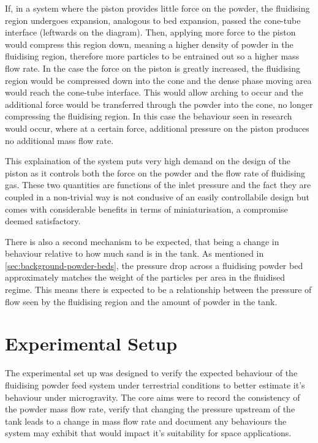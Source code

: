 If, in a system where the piston provides little force on the powder, the fluidising region undergoes expansion, analogous to bed expansion, passed the cone-tube interface (leftwards on the diagram). Then, applying more force to the piston would compress this region down, meaning a higher density of powder in the fluidising region, therefore more particles to be entrained out so a higher mass flow rate. In the case the force on the piston is greatly increased, the fluidising region would be compressed down into the cone and the dense phase moving area would reach the cone-tube interface. This would allow arching to occur and the additional force would be transferred through the powder into the cone, no longer compressing the fluidising region. In this case the behaviour seen in research would occur, where at a certain force, additional pressure on the piston produces no additional mass flow rate. 

This explaination of the system puts very high demand on the design of the piston as it controls both the force on the powder and the flow rate of fluidising gas. These two quantities are functions of the inlet pressure and the fact they are coupled in a non-trivial way is not condusive of an easily controllabile design but comes with considerable benefits in terms of miniaturisation, a compromise deemed satisfactory.

There is also a second mechanism to be expected, that being a change in behaviour relative to how much sand is in the tank. As mentioned in \autoref{sec:background-powder-beds}, the pressure drop across a fluidising powder bed approximately matches the weight of the particles per area in the fluidised regime. This means there is expected to be a relationship between the pressure of flow seen by the fluidising region and the amount of powder in the tank.

\section{Experimental Setup}
The experimental set up was designed to verify the expected behaviour of the fluidising powder feed system under terrestrial conditions to better estimate it's behaviour under microgravity. The core aims were to record the consistency of the powder mass flow rate, verify that changing the pressure upstream of the tank leads to a change in mass flow rate and document any behaviours the system may exhibit that would impact it's suitability for space applications.


